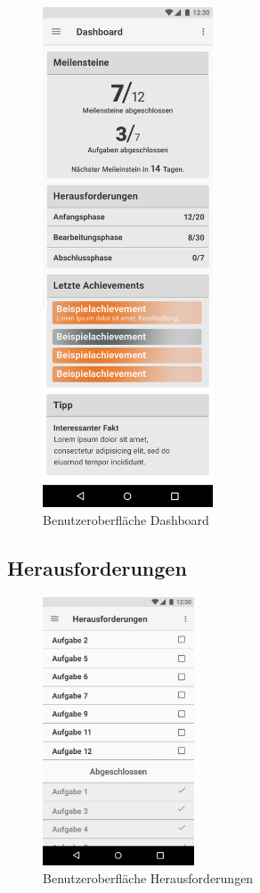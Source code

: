 \documentclass{scrreprt}
\begin{document}
\begin{figure}[H]
	\centering
	\includegraphics[width=0.45\textwidth,keepaspectratio]{Bilder/Dashboard.png}
	\caption{Benutzeroberfläche Dashboard}
	\label{img:dashboard}
\end{figure}

\newpage
\subsection{Herausforderungen}

\begin{figure}[H]
	\centering
	\includegraphics[width=0.4\textwidth, keepaspectratio]{Bilder/AufgabenSortiert.jpg}
	\caption{Benutzeroberfläche Herausforderungen}
	\label{img:aufgaben}
\end{figure}
\end{document}
